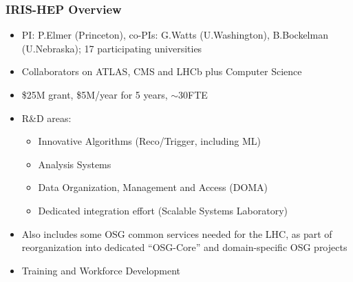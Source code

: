 \begin{frame}
\frametitle{IRIS-HEP Overview}

\begin{itemize}
\item PI: P.Elmer (Princeton), co-PIs: G.Watts (U.Washington), B.Bockelman (U.Nebraska); 17 participating universities 
\item Collaborators on ATLAS, CMS and LHCb plus Computer Science
\item \$25M grant, \$5M/year for 5 years, $\sim$30FTE
\item R\&D areas:
  \begin{itemize}
  \item Innovative Algorithms (Reco/Trigger, including ML)
  \item Analysis Systems
  \item Data Organization, Management and Access (DOMA)
  \item Dedicated integration effort (Scalable Systems Laboratory)
  \end{itemize}
\item Also includes some OSG common services needed for the LHC, as part of reorganization into dedicated ``OSG-Core'' and domain-specific OSG projects
\item Training and Workforce Development
\end{itemize}

\end{frame}


